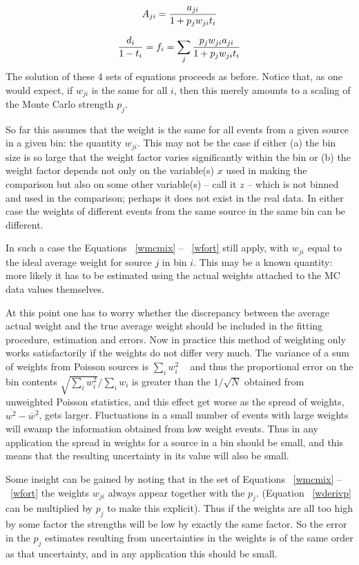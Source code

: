 \begin{equation}
A_{ji} = {a_{ji} \over 1 + p_j w_{ji} t_i} \label{eqwalpha}
\end{equation}
 
\begin{equation}
{d_i \over 1 - t_i} = f_i =  \sum_j {p_j w_{ji} a_{ji}
\over 1 + p_j w_{ji} t_i} \label{wfort}
\end{equation}
The solution of these 4 sets of equations proceeds as before.
Notice that, as one would expect, if $w_{ji}$ is the same for all $i$, then
this merely amounts to a scaling of the Monte Carlo strength $p_j$.
 
So far this assumes that the weight is the same for all events
from a given source in a given bin: the quantity $w_{ji}$.
This may not be the case if either (a) the bin size is so large that the
weight factor varies significantly within the bin or (b) the
weight factor depends not only on the variable(s) $x$ used in making the
comparison but also on some other variable(s) -- call it $z$ -- which is
not binned and used in the comparison;
perhaps it does not exist in the real data.  In either
case the weights of different events from the same source
in the same bin can be different.
 
In such a case the Equations ~\ref{wmcmix} -- ~\ref{wfort} still apply,
with $w_{ji}$ equal to the ideal average weight for source $j$ in bin $i$.
This may be a known quantity: more likely it has to be estimated using
the actual weights attached to the MC data values themselves.
 
At this point one has to worry whether the discrepancy between the
average actual weight and the true average weight should be
included in the fitting procedure, estimation and errors.
Now in practice this method of weighting only works satisfactorily if
the weights do not differ very much.   The variance of a sum of weights
from Poisson sources is $\sum_i w_i^2$ ~\cite{bib-WEIGHTS} and thus
the proportional error on the bin contents
$\sqrt{\sum_i w_i^2}/\sum_i w_i$ is greater than
the $1/\sqrt{N}$ obtained from unweighted Poisson statistics, and this
effect get worse as the spread of weights, $\overline{w^2} - \overline w ^2$,
gets larger.   Fluctuations in a small number of events with large weights
will swamp the information obtained from low weight events.
Thus in any application the
spread in weights for a source in a bin should be small, and
this means that the resulting uncertainty in its value will also be small.
 
Some insight can be gained by noting that in the set of Equations
~\ref{wmcmix} -- ~\ref{wfort} the
weights $w_{ji}$ always appear together with the $p_j$.  (Equation
~\ref{wderivp} can be multiplied by $p_j$ to make this explicit).  Thus if the
weights are all too high by some factor the
strengths will be low by exactly the same factor.   So the error in the $p_j$
estimates
resulting from uncertainties in the weights
is of the same order as that uncertainty, and in any application
this should be small.
 
